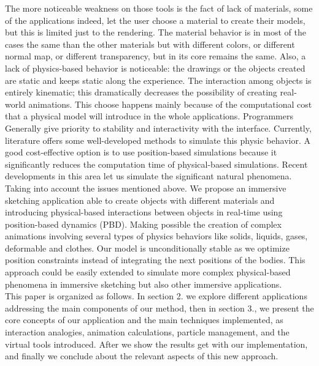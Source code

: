 \documentclass{vgtc}                          %
\begin{document}
The more noticeable weakness on those tools is the fact of lack of materials, some of the applications indeed, let the user choose a material to create their models, but this is limited just to the rendering. The material behavior is in most of the cases the same than the other materials but with different colors, or different normal map, or different transparency, but in its core remains the same. Also, a lack of physics-based behavior is noticeable: the drawings or the objects created are static and keeps static along the experience. The interaction among objects is entirely kinematic; this dramatically decreases the possibility of creating real-world animations. This choose happens mainly because of the computational cost that a physical model will introduce in the whole applications. Programmers Generally give priority to stability and interactivity with the interface. Currently, literature offers some well-developed methods to simulate this physic behavior. A good cost-effective option is to use position-based simulations because it significantly reduces the computation time of physical-based simulations. Recent developments in this area let us simulate the significant natural phenomena.\\

Taking into account the issues mentioned above. We propose an immersive sketching application able to create objects with different materials and introducing physical-based interactions between objects in real-time using position-based dynamics (PBD). Making possible the creation of complex animations involving several types of physics behaviors like solids, liquids, gases, deformable and clothes. Our model is unconditionally stable as we optimize position constraints instead of integrating the next positions of the bodies. This approach could be easily extended to simulate more complex physical-based phenomena in immersive sketching but also other immersive applications.\\

This paper is organized as follows. In section 2. we explore different applications addressing the main components of our method, then in section 3., we present the core concepts of our application and the main techniques implemented, as interaction analogies, animation calculations, particle management, and the virtual tools introduced. After we show the results get with our implementation, and finally we conclude about the relevant aspects of this new approach.
\end{document}
